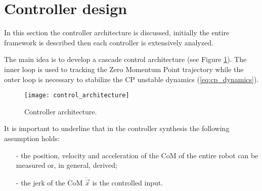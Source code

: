 \section{Controller design}
In this section the controller architecture is discussed, initially the entire framework
is described then each controller is extensively analyzed.
\par
The main idea is to develop a cascade control architecture (see Figure \ref{fig:control_architecuture}).
The inner loop is used to tracking the
Zero Momentum Point trajectory while the outer loop is necessary to stabilize the
CP unstable dynamics (\ref{eq:cp_dynamics}).
\begin{figure}[!ht]
  \centering
  \texttt{[image: control\_architecture]}
  \caption{Controller architecture. \label{fig:control_architecuture}}
\end{figure}
\par
It is important to underline that in the controller synthesis the following assumption holds:
\begin{itemize}
\item[-] the position, velocity and acceleration of the CoM of the entire robot can be measured or,
  in general, derived;
\item[-] the jerk of the CoM $\dddot{\vec{x}}$ is the controlled input.
\end{itemize}

